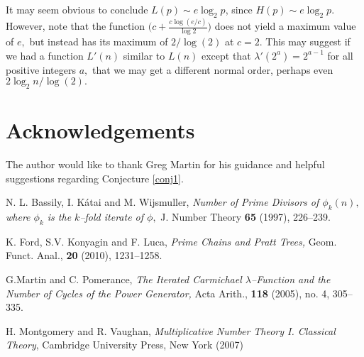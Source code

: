 \documentclass[12pt,regno]{amsart}
\begin{document}
It may seem obvious to conclude $L(p)\sim e\log_2 p$, since $H(p) \sim e\log_2 p.$ However, note that the function $\big(c+\frac{c\log(e/c)}{\log 2}\big)$ does not yield a maximum value of $e,$ but instead has its maximum of $2/\log(2)$ at $c=2.$ This may suggest if we had a function $L'(n)$ similar to $L(n)$ except that $\lambda'(2^a)=2^{a-1}$ for all positive integers $a,$ that we may get a different normal order, perhaps even $2\log_2 n/\log(2).$

\section*{Acknowledgements}
The author would like to thank Greg Martin for his guidance and helpful suggestions regarding Conjecture \ref{conj1}.

\begin{thebibliography}{99}

N. L. Bassily, I. K\'{a}tai and M. Wijsmuller, {\em Number of Prime Divisors of $\phi_k(n),$ where $\phi_k$ is the $k$--fold iterate of $\phi,$} J. Number Theory {\bf65} (1997), 226--239.

K. Ford, S.V. Konyagin and F. Luca, {\em Prime Chains and Pratt Trees,} Geom. Funct. Anal., {\bf20} (2010), 1231--1258.

G.Martin and C. Pomerance, {\em The Iterated Carmichael $\lambda$--Function and the Number of Cycles of the Power Generator,} Acta Arith., {\bf118} (2005), no. 4,  305--335.

H. Montgomery and R. Vaughan, {\em Multiplicative Number Theory I. Classical Theory}, Cambridge University Press, New York (2007)

\end{thebibliography}
\end{document}
